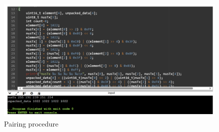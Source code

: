 \documentclass{Configuration_Files/PoliMi3i_thesis}
\begin{document}
\begin{figure}[H]
    \centering
    \includegraphics[scale=0.7]{Shift Algorithm/Screenshot 2024-07-22 at 22.32.05.png}
    \caption{Pairing procedure}
    \label{pairing_procedure_7}
\end{figure}
\end{document}
